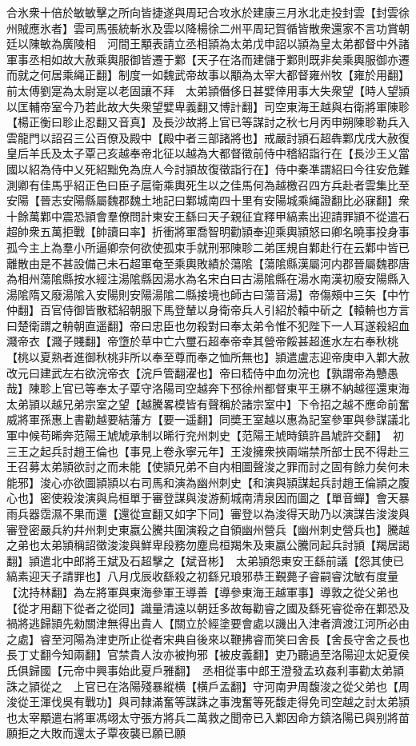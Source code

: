 合氷衆十倍於敏敏擊之所向皆捷遂與周玘合攻氷於建康三月氷北走投封雲【封雲徐州賊應氷者】雲司馬張統斬氷及雲以降楊徐二州平周玘賀循皆散衆還家不言功賞朝廷以陳敏為廣陵相　河間王顒表請立丞相頴為太弟戊申詔以頴為皇太弟都督中外諸軍事丞相如故大赦乘輿服御皆遷于鄴【天子在洛而建儲于鄴則既非矣乘輿服御亦遷而就之何居乘䋲正翻】制度一如魏武帝故事以顒為太宰大都督雍州牧【雍於用翻】前太傅劉寔為太尉寔以老固讓不拜　太弟頴僭侈日甚嬖倖用事大失衆望【時人望頴以匡輔帝室今乃若此故大失衆望嬖卑義翻又博計翻】司空東海王越與右衛將軍陳聄【楊正衡曰聄止忍翻又音真】及長沙故將上官已等謀討之秋七月丙申朔陳聄勒兵入雲龍門以詔召三公百僚及殿中【殿中者三部諸將也】戒嚴討頴石超犇鄴戊戌大赦復皇后羊氏及太子覃己亥越奉帝北征以越為大都督徵前侍中稽紹詣行在【長沙王乂當國以紹為侍中乂死紹黜免為庶人今討頴故復徵詣行在】侍中秦凖謂紹曰今往安危難測卿有佳馬乎紹正色曰臣子扈衛乘輿死生以之佳馬何為越檄召四方兵赴者雲集比至安陽【晉志安陽縣屬魏郡魏土地記曰鄴城南四十里有安陽城乘䋲證翻比必寐翻】衆十餘萬鄴中震恐頴會羣僚問計東安王繇曰天子親征宜釋甲縞素出迎請罪頴不從遣石超帥衆五萬拒戰【帥讀曰率】折衝將軍喬智明勸頴奉迎乘輿頴怒曰卿名曉事投身事孤今主上為羣小所逼卿奈何欲使孤束手就刑邪陳聄二弟匡規自鄴赴行在云鄴中皆已離散由是不甚設備己未石超軍奄至乘輿敗績於蕩隂【蕩隂縣漢屬河内郡晉屬魏郡唐為相州蕩隂縣按水經注湯隂縣因湯水為名宋白曰古湯隂縣在湯水南漢初廢安陽縣入湯隂隋又廢湯隂入安陽則安陽湯隂二縣接境也師古曰蕩音湯】帝傷頰中三矢【中竹仲翻】百官侍御皆散嵇紹朝服下馬登輦以身衛帝兵人引紹於轅中斫之【轅輈也方言曰楚衛謂之輈朝直遥翻】帝曰忠臣也勿殺對曰奉太弟令惟不犯陛下一人耳遂殺紹血濺帝衣【濺子賤翻】帝墯於草中亡六璽石超奉帝幸其營帝餒甚超進水左右奉秋桃【桃以夏熟者進御秋桃非所以奉至尊而奉之恤所無也】頴遣盧志迎帝庚申入鄴大赦改元曰建武左右欲浣帝衣【浣戶管翻濯也】帝曰嵇侍中血勿浣也【孰謂帝為戇愚哉】陳聄上官已等奉太子覃守洛陽司空越奔下邳徐州都督東平王楙不納越徑還東海太弟頴以越兄弟宗室之望【越騰畧模皆有聲稱於諸宗室中】下令招之越不應命前奮威將軍孫惠上書勸越要結藩方【要一遥翻】同奬王室越以惠為記室參軍與參謀議北軍中候苟晞奔范陽王虓虓承制以晞行兖州刺史【范陽王虓時鎮許昌虓許交翻】　初三王之起兵討趙王倫也【事見上卷永寧元年】王浚擁衆挾兩端禁所部士民不得赴三王召募太弟頴欲討之而未能【使頴兄弟不自内相圖聲浚之罪而討之固有餘力矣何未能邪】浚心亦欲圖頴頴以右司馬和演為幽州刺史【和演與頴謀起兵討趙王倫頴之腹心也】密使殺浚演與烏桓單于審登謀與浚游薊城南清泉因而圖之【單音蟬】會天暴雨兵器霑濕不果而還【還從宣翻又如字下同】審登以為浚得天助乃以演謀告浚浚與審登密嚴兵約幷州刺史東嬴公騰共圍演殺之自領幽州營兵【幽州刺史營兵也】騰越之弟也太弟頴稱詔徵浚浚與鮮卑段務勿塵烏桓羯朱及東嬴公騰同起兵討頴【羯居謁翻】頴遣北中郎將王斌及石超擊之【斌音彬】　太弟頴怨東安王繇前議【怨其使已縞素迎天子請罪也】八月戊辰收繇殺之初繇兄琅邪恭王覲薨子睿嗣睿沈敏有度量【沈持林翻】為左將軍與東海參軍王導善【導參東海王越軍事】導敦之從父弟也【從才用翻下從者之從同】識量清遠以朝廷多故每勸睿之國及繇死睿從帝在鄴恐及禍將逃歸頴先勑關津無得出貴人【關立於經塗要會處以譏出入津者濟渡江河所必由之處】睿至河陽為津吏所止從者宋典自後來以鞭拂睿而笑曰舍長【舍長守舍之長也長丁丈翻今知兩翻】官禁貴人汝亦被拘邪【被皮義翻】吏乃聽過至洛陽迎太妃夏侯氏俱歸國【元帝中興事始此夏戶雅翻】　丞相從事中郎王澄發孟玖姦利事勸太弟頴誅之頴從之　上官已在洛陽殘暴縱横【横戶孟翻】守河南尹周馥浚之從父弟也【周浚從王渾伐吳有戰功】與司隸滿奮等謀誅之事洩奮等死馥走得免司空越之討太弟頴也太宰顒遣右將軍馮翊太守張方將兵二萬救之聞帝已入鄴因命方鎮洛陽已與别將苗願拒之大敗而還太子覃夜襲已願已願